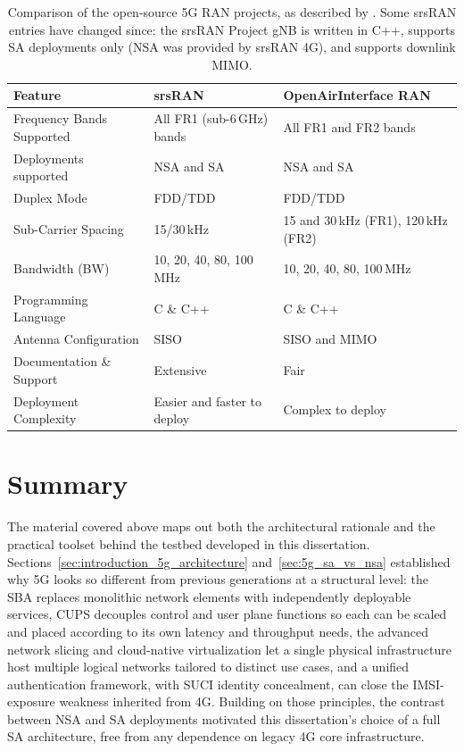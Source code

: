 \begin{table}[htbp]
\centering
\footnotesize
\renewcommand{\arraystretch}{1.5}
\begin{tabularx}{\textwidth}{|l|X|X|}
\hline
\rowcolor{gray!30}
\textbf{Feature} & \textbf{srsRAN} & \textbf{OpenAirInterface \gls{RAN}} \\ \hline
Frequency Bands Supported & All FR1 (sub-6\,GHz) bands & All FR1 and FR2 bands \\ \hline
Deployments supported & \gls{NSA} and \gls{SA} & \gls{NSA} and \gls{SA} \\ \hline
Duplex Mode & \gls{FDD}/\gls{TDD} & \gls{FDD}/\gls{TDD} \\ \hline
Sub-Carrier Spacing & 15/30\,kHz & 15 and 30\,kHz (FR1), 120\,kHz (FR2) \\ \hline
Bandwidth (BW) & 10, 20, 40, 80, 100\,MHz & 10, 20, 40, 80, 100\,MHz \\ \hline
Programming Language & C \& C++ & C \& C++ \\ \hline
Antenna Configuration & SISO & SISO and \gls{MIMO} \\ \hline
Documentation \& Support & Extensive & Fair \\ \hline
Deployment Complexity & Easier and faster to deploy & Complex to deploy \\ \hline
\end{tabularx}
\caption[Comparison of the open-source 5G RAN projects.]{Comparison of the open-source 5G RAN projects, as described by \textcite{mamushiane2023deploying}. Some srsRAN entries have changed since: the srsRAN Project \gls{gNB} is written in C++, supports \gls{SA} deployments only (\gls{NSA} was provided by srsRAN 4G), and supports downlink \gls{MIMO}.}
\label{tab:5gran_implementations}
\end{table}

\section{Summary}
\label{sec:5g_fundamentals_summary}

The material covered above maps out both the architectural rationale and the practical toolset behind the testbed developed in this dissertation. Sections~\ref{sec:introduction_5g_architecture} and~\ref{sec:5g_sa_vs_nsa} established why 5G looks so different from previous generations at a structural level: the \gls{SBA} replaces monolithic network elements with independently deployable services, \gls{CUPS} decouples control and user plane functions so each can be scaled and placed according to its own latency and throughput needs, the advanced network slicing and cloud-native virtualization let a single physical infrastructure host multiple logical networks tailored to distinct use cases, and a unified authentication framework, with \gls{SUCI} identity concealment, can close the \gls{IMSI}-exposure weakness inherited from 4G. Building on those principles, the contrast between \gls{NSA} and \gls{SA} deployments motivated this dissertation's choice of a full \gls{SA} architecture, free from any dependence on legacy 4G core infrastructure.

